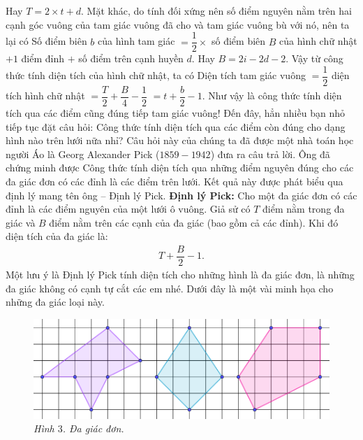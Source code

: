 \begin{multicols}{2}
	\vskip 0.1cm
	Hay $T = 2\times t + d$.
	\vskip 0.1cm
	Mặt khác, do tính đối xứng nên số điểm nguyên nằm trên hai cạnh góc vuông của tam giác vuông đã cho và tam giác vuông bù với nó, nên ta lại có
	\vskip 0.1cm
	Số điểm biên $b$ của hình tam giác $= \dfrac{1}{2} \times$ số điểm biên $B$ của hình chữ nhật 
	$+ 1$ điểm đỉnh $+$ số điểm trên cạnh huyền $d$.
	\vskip 0.1cm
	Hay $B = 2i - 2d - 2$.
	\vskip 0.1cm
	Vậy từ công thức tính diện tích của hình chữ nhật, ta có
	\vskip 0.1cm
	Diện tích tam giác vuông $= \dfrac{1}{2}$ diện tích hình chữ nhật
	$= \dfrac{T}{2} + \dfrac{B}{4} - \dfrac{1}{2}$
	$= t + \dfrac{b}{2} - 1$.
	\vskip 0.1cm
	Như vậy là công thức tính diện tích qua các điểm cũng đúng tiếp tam giác vuông! Đến đây, hẳn nhiều bạn nhỏ tiếp tục đặt câu hỏi: Công thức tính diện tích qua các điểm còn đúng cho dạng hình nào trên lưới nữa nhỉ? Câu hỏi này của chúng ta đã được một nhà toán học người Áo là Georg Alexander Pick ($1859 - 1942$) đưa ra câu trả lời. Ông đã chứng minh được Công thức tính diện tích qua những điểm nguyên đúng cho các đa giác đơn có các đỉnh là các điểm trên lưới. Kết quả này được phát biểu qua định lý mang tên ông -- Định lý Pick.
	\vskip 0.1cm
	\textbf{\color{toancuabi}Định lý Pick:} Cho một đa giác đơn có các đỉnh là các điểm nguyên của một lưới ô vuông. Giả sử có $T$ điểm nằm trong đa giác và $B$ điểm nằm trên các cạnh của đa giác (bao gồm cả các đỉnh). Khi đó diện tích của đa giác là:
	\begin{align*}
		T+  \dfrac{B}{2}-1.
	\end{align*}
	Một lưu ý là Định lý Pick tính diện tích cho những hình là đa giác đơn, là những đa giác không có cạnh tự cắt các em nhé. Dưới đây là một vài minh họa cho những đa giác loại này.
	\begin{figure}[H]
		\vspace*{-5pt}
		\centering
		\captionsetup{labelformat= empty, justification=centering}
		\includegraphics[width= 1\linewidth]{3}
		\caption{\small\textit{\color{toancuabi}Hình $3$. Đa giác đơn.}}
		\vspace*{-5pt}
	\end{figure}

\end{multicols}
